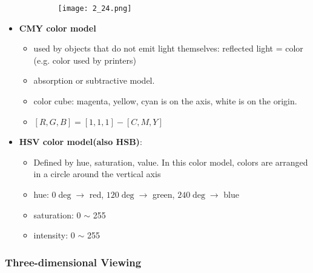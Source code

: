 \documentclass{standalone}
\begin{document}
\begin{itemize}
\begin{itemize}
					\begin{figure}[H]
						\texttt{[image: 2\_24.png]}
					\end{figure}
			\end{itemize}
		\item \textbf{CMY color model}
			\begin{itemize}
			 	\item used by objects that do not emit light themselves: reflected light = color (e.g. color used by printers)
			 	\item absorption or subtractive model.
			 	\item color cube: magenta, yellow, cyan is on the axis, white is on the origin.
			 	\item $[R, G, B] = [1, 1, 1] - [C, M, Y]$
			 \end{itemize}
		\item \textbf{HSV color model(also HSB)}: 
			\begin{itemize} 
				\item Defined by hue, saturation, value. In this color model, colors are arranged in a circle around the vertical axis
				\item hue: $0\deg \rightarrow$ red, $120\deg \rightarrow$ green, $240\deg \rightarrow$ blue
				\item saturation: 0 $\sim$ 255
				\item intensity: 0 $\sim$ 255
			\end{itemize}
\end{itemize}
\subsubsection{Three-dimensional Viewing}
\end{document}
